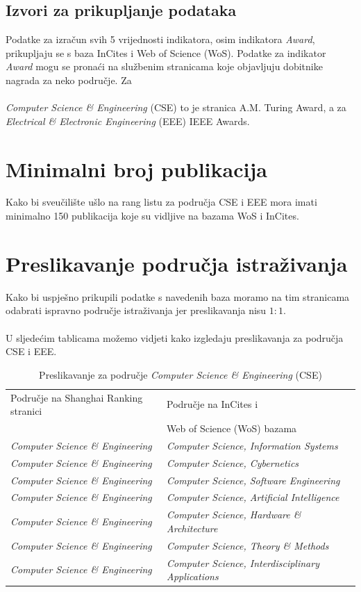 \documentclass[times, utf8, zavrsni]{fer}
\begin{document}
\subsection{Izvori za prikupljanje podataka}        
Podatke za izračun svih 5 vrijednosti indikatora, osim indikatora \emph{Award}, prikupljaju se s baza InCites i Web of Science (WoS). 
Podatke za indikator \emph{Award} mogu se pronaći na službenim stranicama koje objavljuju dobitnike nagrada za neko područje.
Za \\\\\emph{Computer Science \& Engineering} (CSE) to je stranica A.M. Turing Award, a za \emph{\\Electrical \& Electronic Engineering} (EEE) IEEE Awards.

\section{Minimalni broj publikacija} Kako bi sveučilište ušlo na rang listu za područja CSE i EEE mora imati minimalno 150 publikacija koje su vidljive 
na bazama WoS i InCites.
\\ \section{Preslikavanje područja istraživanja}Kako bi uspješno prikupili podatke s navedenih baza moramo na tim stranicama odabrati ispravno područje istraživanja jer preslikavanja nisu $1:1$.
\\\\U sljedećim tablicama možemo vidjeti kako izgledaju preslikavanja za područja CSE i EEE.

\begin{table}[htb]
    \caption{Preslikavanje za područje \emph{Computer Science \& Engineering} (CSE)}
    \label{tbl:konstante}
    \centering
    \begin{tabular}{ll} \hline
    Područje na Shanghai Ranking stranici & Područje na InCites i \\ & Web of Science (WoS) bazama\\ \hline
    \emph{Computer Science \& Engineering} & \emph{Computer Science, Information Systems} \\
    \emph{Computer Science \& Engineering} & \emph{Computer Science, Cybernetics} \\
    \emph{Computer Science \& Engineering} & \emph{Computer Science, Software Engineering} \\
    \emph{Computer Science \& Engineering} & \emph{Computer Science, Artificial Intelligence} \\
    \emph{Computer Science \& Engineering} & \emph{Computer Science, Hardware \& Architecture} \\
    \emph{Computer Science \& Engineering} & \emph{Computer Science, Theory \& Methods} \\
    \emph{Computer Science \& Engineering} & \emph{Computer Science, Interdisciplinary Applications} \\
    \end{tabular}
    \end{table}
    \FloatBarrier
    \hfil
\end{document}

